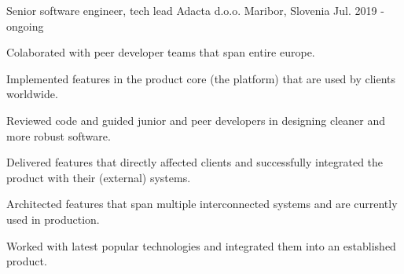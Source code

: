 

\begin{cventries}

  \cventry
    {Senior software engineer, tech lead} %
    {Adacta d.o.o.} %
    {Maribor, Slovenia} %
    {Jul. 2019 - ongoing} %
    {
      \begin{cvitems}          
        \item {Colaborated with peer developer teams that span entire europe.}
        \item {Implemented features in the product core (the platform) 
        that are used by clients worldwide.}
        \item {Reviewed code and guided junior and peer developers 
        in designing cleaner and more robust software.}
        \item {Delivered features that directly affected clients and 
        successfully integrated the product with their (external) systems.}
        \item {Architected features that span multiple interconnected 
        systems and are currently used in production.}
        \item {Worked with latest popular technologies and integrated 
        them into an established product.}
      \end{cvitems}
    }


\end{cventries}
